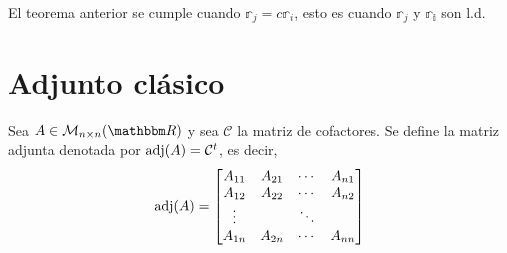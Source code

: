 \begin{observation}
    El teorema anterior se cumple cuando $\mathbb{r}_j = c\mathbb{r}_i$, esto es cuando $\mathbb{r}_j$ y $\mathbb{r_i}$ son l.d.
\end{observation}

\section{Adjunto clásico}

\begin{definition}
    Sea $A \in \mathcal{M}_{n \times n}(\RR)$ y sea $\mathcal{C}$ la matriz de cofactores. Se define la matriz adjunta denotada por $\operatorname{adj}(A) = \mathcal{C}^t$, es decir,
    $$\operatorname{adj}(A) = \begin{bmatrix}
        A_{11} & A_{21} & \cdots & A_{n1}\\
        A_{12} & A_{22} & \cdots & A_{n2}\\
        \vdots &  & \ddots & \\
        A_{1n} & A_{2n} & \cdots & A_{nn}
    \end{bmatrix}$$
\end{definition}

